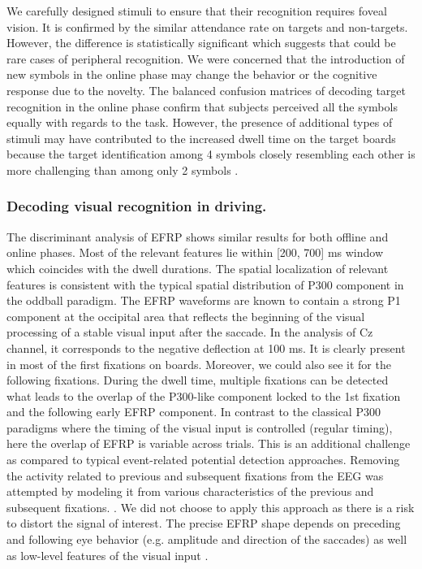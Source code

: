 \documentclass[12pt]{iopart}
\begin{document}
We carefully designed stimuli
to ensure that their recognition requires foveal vision.
It is confirmed by the similar
attendance rate on targets and non-targets.
However, the difference is statistically significant 
which suggests that could be rare cases of peripheral recognition.
We were concerned that the introduction of new symbols in the online phase
may change the behavior or the cognitive response due to the novelty.
The balanced confusion matrices of decoding target recognition in the online phase
confirm that subjects perceived all the symbols equally with regards
to the task. However, the presence of additional types of stimuli 
may have contributed to the increased dwell time 
on the target boards because the target identification 
among 4 symbols closely resembling each other 
is more challenging than among only 2 symbols
\cite{dick_processing_1971,alegria_time_1970}.


\subsubsection*{Decoding visual recognition in driving.}
The discriminant analysis of EFRP shows similar results for both
offline and online phases. Most of the relevant
features lie within [200, 700] ms window which coincides with the dwell
durations. The spatial localization of relevant features is consistent with the typical
spatial distribution of P300 component in the oddball paradigm.
The EFRP waveforms are known to contain a strong P1 component at the occipital
area that reflects the beginning of the visual processing of a stable visual input
after the saccade. In the analysis of Cz channel, it corresponds to the negative
deflection at 100 ms. It is clearly present in most of the first fixations on boards.
Moreover, we could also see it for the following fixations.
During the dwell time, multiple fixations can be detected 
what leads to the overlap of the P300-like component
locked to the 1st fixation and the following early EFRP component.
In contrast to the classical P300 paradigms where the timing
of the visual input is controlled (regular timing), here the
overlap of EFRP is variable across trials.
This is an additional challenge as compared to typical
event-related potential detection approaches.
Removing the activity related to previous and subsequent fixations
from the EEG was attempted by modeling it from
various characteristics of the previous and subsequent fixations.
\cite{devillez_p300_2015,devillez_eye_2015,kristensen_comparison_2015}.
We did not choose to apply this approach as there is a risk 
to distort the signal of interest.
The precise EFRP shape depends on preceding and following
eye behavior (e.g. amplitude and direction of the saccades)
as well as low-level features of the visual input
\cite{nikolaev_combining_2016}.
\end{document}
